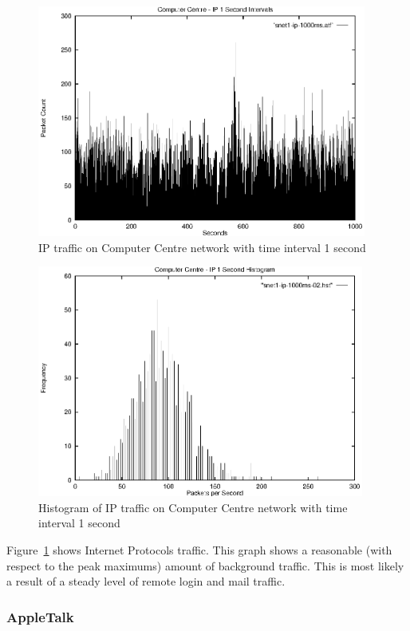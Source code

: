 \begin{figure}
\includegraphics[height=3in]{pics/snet1-ip-1s-freq.eps}
\caption{IP traffic on Computer Centre network with time interval 1 second}
\label{results:snet1.ip.1s.freq}
\end{figure}

\begin{figure}
\includegraphics[height=3in]{pics/snet1-ip-1s-hist-02.eps}
\caption{Histogram of IP traffic on Computer Centre network with time interval 1 second}
\label{results:snet1.ip.1s.hist}
\end{figure}


Figure~\ref{results:snet1.ip.1s.freq} shows Internet Protocols traffic.
This graph shows a reasonable (with respect to the peak maximums)
amount of background traffic.  This is most likely a result of a
steady level of remote login and mail traffic.

\subsubsection{AppleTalk}

